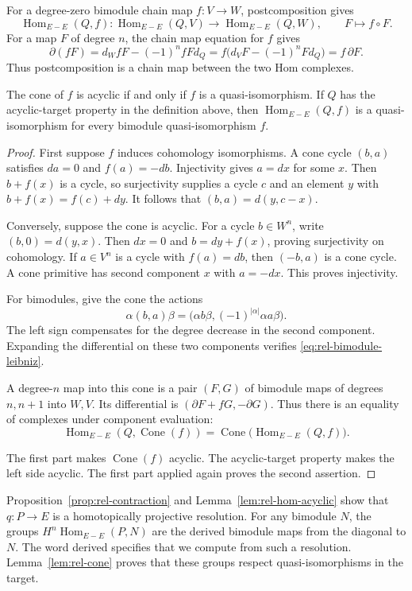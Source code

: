 For a degree-zero bimodule chain map $f:V\to W$, postcomposition gives
\[
 \operatorname{Hom}_{E-E}(Q,f):
 \operatorname{Hom}_{E-E}(Q,V)\longrightarrow
 \operatorname{Hom}_{E-E}(Q,W),\qquad F\longmapsto f\circ F.
\]
For a map $F$ of degree $n$, the chain map equation for $f$ gives
\[
 \partial(fF)=d_WfF-(-1)^n fF d_Q
 =f\bigl(d_VF-(-1)^nF d_Q\bigr)=f\,\partial F.
\]
Thus postcomposition is a chain map between the two Hom complexes.

\begin{lemma}\label{lem:rel-cone}
The cone of $f$ is acyclic if and only if $f$ is a quasi-isomorphism.
If $Q$ has the acyclic-target property in the definition above, then
$\operatorname{Hom}_{E-E}(Q,f)$ is a quasi-isomorphism for every bimodule
quasi-isomorphism $f$.
\end{lemma}

\begin{proof}
First suppose $f$ induces cohomology isomorphisms.
A cone cycle $(b,a)$ satisfies $da=0$ and $f(a)=-db$.
Injectivity gives $a=dx$ for some $x$.
Then $b+f(x)$ is a cycle, so surjectivity supplies a cycle $c$ and an
element $y$ with $b+f(x)=f(c)+dy$.
It follows that $(b,a)=d(y,c-x)$.

Conversely, suppose the cone is acyclic.
For a cycle $b\in W^n$, write $(b,0)=d(y,x)$.
Then $dx=0$ and $b=dy+f(x)$, proving surjectivity on cohomology.
If $a\in V^n$ is a cycle with $f(a)=db$, then $(-b,a)$ is a cone cycle.
A cone primitive has second component $x$ with $a=-dx$.
This proves injectivity.

For bimodules, give the cone the actions
\[
 \alpha(b,a)\beta
 =\bigl(\alpha b\beta,(-1)^{|\alpha|}\alpha a\beta\bigr).
\]
The left sign compensates for the degree decrease in the second component.
Expanding the differential on these two components verifies
\eqref{eq:rel-bimodule-leibniz}.

A degree-$n$ map into this cone is a pair $(F,G)$ of bimodule maps
of degrees $n,n+1$ into $W,V$.
Its differential is $(\partial F+fG,-\partial G)$.
Thus there is an equality of complexes under component evaluation:
\[
 \operatorname{Hom}_{E-E}(Q,\operatorname{Cone}(f))
 =\operatorname{Cone}\bigl(\operatorname{Hom}_{E-E}(Q,f)\bigr).
\]

The first part makes $\operatorname{Cone}(f)$ acyclic.
The acyclic-target property makes the left side acyclic.
The first part applied again proves the second assertion.
\end{proof}

Proposition~\ref{prop:rel-contraction} and
Lemma~\ref{lem:rel-hom-acyclic} show that $q:P\to E$ is a
homotopically projective resolution.
For any bimodule $N$, the groups
$H^n\operatorname{Hom}_{E-E}(P,N)$ are the derived bimodule maps from the
diagonal to $N$. The word derived specifies that we compute from such a
resolution. Lemma~\ref{lem:rel-cone} proves that these groups respect
quasi-isomorphisms in the target.

